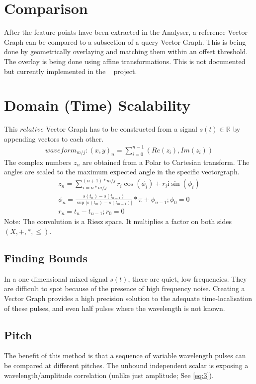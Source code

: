 \documentclass{report}
\begin{document}
\section*{Comparison}
After the feature points have been extracted in the Analyser, a reference Vector Graph can be compared to a subsection of a query Vector Graph. This is being done by geometrically overlaying and matching them within an offset threshold. The overlay is being done using affine transformations. This is not documented but currently implemented in the ~\cite[Stopeight\_Comparator.tex]{Comparator} project.
\section{Domain (Time) Scalability}
This $relative$ Vector Graph has to be constructed from a signal $s(t)\in \mathbb{R}$ by appending vectors to each other.
\begin{align}
waveform_{m/j}: (x,y)_{n}=\sum \limits _{i=0}^{n-1}(Re(z_{i}),Im(z_{i}))
\end{align}
The complex numbers $z_{n}$ are obtained from a Polar to Cartesian transform. The angles are scaled to the maximum expected angle in the specific vectorgraph.
\begin{align}
z_{n}=\sum \limits _{i=n*m/j}^{(n+1)*m/j}r_{i}\cos(\phi_{i})+r_{i}\mathrm{i}\sin(\phi_{i})\\
\phi_{n}=\frac{s(t_{n})-s(t_{n-1})}{\sup \lvert s(t_{m})-s(t_{m-1}) \rvert}*\pi+\phi_{n-1};\phi_{0}=0\\
r_{n}=t_{n}-t_{n-1};r_{0}=0
\end{align}
Note: The convolution is a Riesz space. It multiplies a factor on both sides $(X,+,*,\leq)$.
\subsection{Finding Bounds}
In a one dimensional mixed signal $s(t)$, there are quiet, low frequencies. They are difficult to spot because of the presence of high frequency noise. Creating a Vector Graph provides a high precision solution to the adequate time-localisation of these pulses, and even half pulses where the wavelength is not known.
\subsection{Pitch}
The benefit of this method is that a sequence of variable wavelength pulses can be compared at different pitches. The unbound independent scalar is exposing a wavelength/amplitude correlation (unlike just amplitude; See \eqref{eq:3}).
\end{document}
